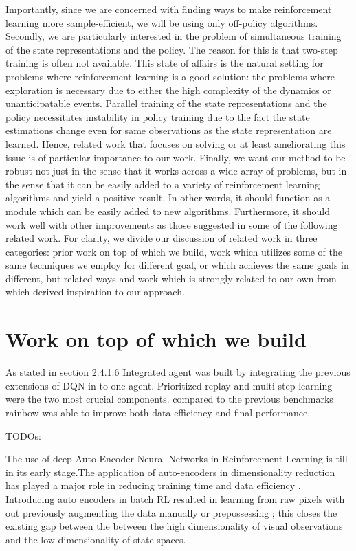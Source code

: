 Importantly, since we are concerned with finding ways to make  
reinforcement learning more sample-efficient, 
we will be using only off-policy algorithms. 
Secondly, we are particularly interested in the problem of 
simultaneous training of the state representations and the policy.
The reason for this is that two-step training is often not available.
This state of affairs is the natural setting for problems where reinforcement learning 
is a good solution: the problems where exploration is necessary due to 
either the high complexity of the dynamics or unanticipatable events.
Parallel training of the state representations and the policy necessitates
instability in policy training due to the fact the state estimations
change even for same observations as the state representation are learned.
Hence, related work that focuses on solving or at least ameliorating this issue 
is of particular importance to our work.
Finally, we want our method to be robust not just in the sense that it works
across a wide array of problems, but in the sense that it can be 
easily added to a variety of reinforcement learning algorithms
and yield a positive result. In other words, it should function as a module 
which can be easily added to new algorithms.
Furthermore, it should work well with other improvements as those suggested 
in some of the following related work.
For clarity, we divide our discussion of related work in three categories:
prior work on top of which we build, work which utilizes some of the same
techniques we employ for different goal, or which achieves the same goals
in different, but related ways and work which is strongly related to our own 
from which derived inspiration to our approach.

\section{Work on top of which we build}

As stated in section 2.4.1.6 Integrated agent  
was built by integrating the previous extensions of DQN in to one agent.
Prioritized replay and multi-step learning were the two most crucial components.
compared to the previous benchmarks rainbow was able to improve both  
data efficiency and final performance.

TODOs: \cite{sac}
 
The use of deep Auto-Encoder Neural Networks in Reinforcement Learning is till in its early stage.The application of auto-encoders in dimensionality reduction has played a major role in reducing training time and data efficiency
 \cite{auto-encoder for Efficient Embedded Reinforcement Learning}.
 Introducing auto encoders in batch RL resulted in learning from 
 raw pixels with out previously augmenting the data manually or 
 prepossessing \cite{firstaeinrl}; this closes the  
 existing gap between the  between the high dimensionality of 
 visual observations and the low dimensionality of state spaces.


